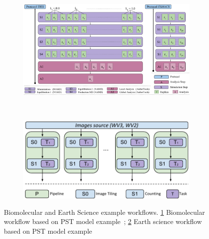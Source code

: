 \begin{figure}[ht!]
    \centering
    \begin{subfigure}[b]{0.45\textwidth}
        \includegraphics[width=\linewidth]{figures/bio_workflow.pdf}
        \caption{}
        \label{fig:bio_workflow}
    \end{subfigure}%
    ~ 
    \begin{subfigure}[b]{0.45\textwidth}
        \includegraphics[width=\linewidth]{figures/earth_workflow.pdf}
        \caption{}
        \label{fig:earth_workflow}
    \end{subfigure}
    \caption{Biomolecular and Earth Science example workflows. \ref{fig:bio_workflow} Biomolecular workflow based on PST model example~\cite{dakka2018concurrent}; \ref{fig:earth_workflow} Earth science workflow based on PST model example~\cite{paraskevakos2019workflow}}\label{fig:bio_earth_workflows}
\end{figure}


